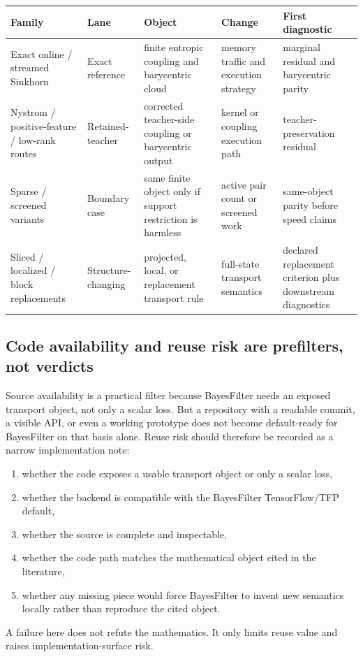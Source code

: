 \begin{center}
\scriptsize
\setlength{\tabcolsep}{3pt}
\begin{tabular}{@{}p{} p{} p{} p{} p{}@{}}
\toprule
Family & Lane & Object & Change & First diagnostic \\
\midrule
Exact online / streamed Sinkhorn & Exact reference & finite entropic coupling and barycentric cloud & memory traffic and execution strategy & marginal residual and barycentric parity \\
Nystrom / positive-feature / low-rank routes & Retained-teacher & corrected teacher-side coupling or barycentric output & kernel or coupling execution path & teacher-preservation residual \\
Sparse / screened variants & Boundary case & same finite object only if support restriction is harmless & active pair count or screened work & same-object parity before speed claims \\
Sliced / localized / block replacements & Structure-changing & projected, local, or replacement transport rule & full-state transport semantics & declared replacement criterion plus downstream diagnostics \\
\bottomrule
\end{tabular}
\setlength{\tabcolsep}{6pt}
\normalsize
\end{center}

\subsection{Code availability and reuse risk are prefilters, not verdicts}
\label{sec:bf-dpf-debug-code-risk}

Source availability is a practical filter because BayesFilter needs an exposed
transport object, not only a scalar loss.  But a repository with a readable
commit, a visible API, or even a working prototype does not become default-ready
for BayesFilter on that basis alone.  Reuse risk should therefore be recorded as a
narrow implementation note:
\begin{enumerate}[label=(\arabic*)]
  \item whether the code exposes a usable transport object or only a scalar loss,
  \item whether the backend is compatible with the BayesFilter TensorFlow/TFP
    default,
  \item whether the source is complete and inspectable,
  \item whether the code path matches the mathematical object cited in the
    literature,
  \item whether any missing piece would force BayesFilter to invent new semantics
    locally rather than reproduce the cited object.
\end{enumerate}
A failure here does not refute the mathematics.  It only limits reuse value and
raises implementation-surface risk.

